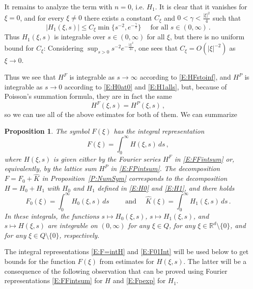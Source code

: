 \documentclass[12pt]{amsart}
\newtheorem{proposition}[theorem]{Proposition}
\theoremstyle{definition}
\theoremstyle{remark}
\numberwithin{equation}{section}
\newcommand\R{{\mathbb R}}
\let\hat=\widehat
\begin{document}
It remains to analyze the term with $n=0$, i.e. $H_{1}$. It is clear that it vanishes for $\xi=0$, and for every $\xi\ne0$ there exists a constant $C_{\xi}$ and $0<\gamma<\frac{|\xi|^{2}}4$ such that 
\begin{equation}
\label{E:H1alls}
|H_{1}(\xi,s)| \le C_{\xi} \min\{s^{-2}, e^{-\frac\gamma s} \}
\quad\mbox{ for all } s\in(0,\infty)\,.
\end{equation}
Thus $H_{1}(\xi,s)$ is integrable over $s\in(0,\infty)$ for all $\xi$, but there is no uniform bound for $C_{\xi}$: 
Considering $\sup_{s>0}s^{-2}e^{-\frac{|\xi|^{2}}{4s}}$, one sees that 
$C_{\xi}=O(|\xi|^{-2})$ as $\xi\to0$.

Thus we see that $H^{F}$ is integrable as $s\to\infty$ according to \eqref{E:HFstoinf}, and $H^{P}$ is integrable as $s\to0$ according to \eqref{E:H0at0} and \eqref{E:H1alls}, but, because of Poisson's summation formula, they are in fact the same
$$
  H^{F}(\xi,s) = H^{P}(\xi,s)\,,
$$
so we can use all of the above estimates for both of them.
We can summarize
\begin{proposition}
 \label{P:FInt}
 The symbol $F(\xi)$ has the integral representation
\begin{equation}
\label{E:F=intH}
 F(\xi) = \int_{0}^{\infty} H(\xi,s)\,ds\,,
\end{equation}
where $H(\xi,s)$ is given either by the Fourier series $H^{F}$ in \eqref{E:FFintsum} or, equivalently, by the lattice sum $H^{P}$ in \eqref{E:FPintsum}.  
The decomposition $F=F_{0}+\hat K$ in Proposition~\ref{P:NumSym} corresponds to the decomposition $H=H_{0}+H_{1}$ with $H_{0}$ and $H_{1}$ defined in \eqref{E:H0} and \eqref{E:H1}, and there holds
\begin{equation}
\label{E:F01Int}
F_{0}(\xi) = \int_{0}^{\infty} H_{0}(\xi,s)\,ds \qquad
\mbox{ and }\quad
\hat K(\xi) = \int_{0}^{\infty} H_{1}(\xi,s)\,ds \,.
\end{equation}
In these integrals, the functions $s\mapsto H_{0}(\xi,s)$, $s\mapsto H_{1}(\xi,s)$, and $s\mapsto H(\xi,s)$ are integrable on $(0,\infty)$ for any $\xi\in Q$, for any $\xi\in\R^{d}\setminus\{0\}$, and for any $\xi\in Q\setminus\{0\}$, respectively.
\end{proposition}

The integral representations \eqref{E:F=intH} and  \eqref{E:F01Int} will be used below to get bounds for the function $F(\xi)$ from estimates for $H(\xi,s)$. The latter will be a consequence of the following observation that can be proved using  Fourier representations \eqref{E:FFintsum} for $H$ and \eqref{E:Fpexp} for $H_{1}$. 
\end{document}
